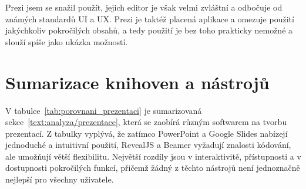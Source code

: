 Prezi jsem se snažil použít, jejich editor je však velmi zvláštní a odbočuje od známých standardů UI a UX.
Prezi je taktéž placená aplikace a omezuje použití jakýchkoliv pokročilých obsahů, a tedy použití je bez toho prakticky nemožné a slouží spíše jako ukázka možností.

\section{Sumarizace knihoven a nástrojů}

V tabulce~\ref{tab:porovnani_prezentaci} je sumarizovaná sekce~\ref{text:analyza/prezentace}, která se zaobírá různým softwarem na tvorbu prezentací.
Z tabulky vyplývá, že zatímco PowerPoint a Google Slides nabízejí jednoduché a intuitivní použití, RevealJS a Beamer vyžadují znalosti kódování, ale umožňují větší flexibilitu.
Největší rozdíly jsou v interaktivitě, přístupnosti a v dostupnosti pokročilých funkcí, přičemž žádný z těchto nástrojů není jednoznačně nejlepší pro všechny uživatele.


\begin{table}[ht!]
    \centering
    \caption{Porovnání aplikací pro tvorbu prezentací}
    \label{tab:porovnani_prezentaci}
\end{table}


